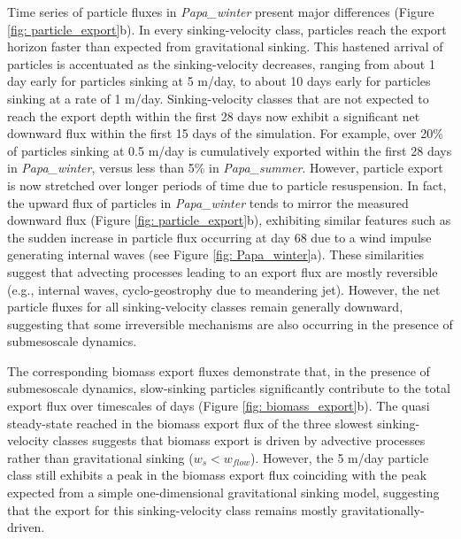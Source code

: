 \documentclass[draft,linenumbers]{agujournal2018}
\newcommand{\fixme}[1]{\color{red}$<$\textbf{FIX ME: #1}$>$\color{black}}
\begin{document}
Time series of particle fluxes in \textit{Papa\_winter} present major differences (Figure \ref{fig: particle_export}b). In every sinking-velocity class, particles reach the export horizon faster than expected from gravitational sinking. This hastened arrival of particles is accentuated as the sinking-velocity decreases, ranging from about 1 day early for particles sinking at 5 m/day, to about 10 days early for particles sinking at a rate of 1 m/day. Sinking-velocity classes that are not expected to reach the export depth within the first 28 days now exhibit a significant net downward flux within the first 15 days of the simulation. For example, over 20\% of particles sinking at 0.5 m/day is cumulatively exported within the first 28 days in \textit{Papa\_winter}, versus less than 5\% in \textit{Papa\_summer}. However, particle export is now stretched over longer periods of time due to particle resuspension. In fact, the upward flux of particles in \textit{Papa\_winter} tends to mirror the measured downward flux (Figure \ref{fig: particle_export}b), exhibiting similar features such as the sudden increase in particle flux occurring at day 68 due to a wind impulse generating internal waves (see Figure \ref{fig: Papa_winter}a). These similarities suggest that advecting processes leading to an export flux are mostly reversible (e.g., internal waves, cyclo-geostrophy due to meandering jet). However, the net particle fluxes for all sinking-velocity classes remain generally downward, suggesting that some irreversible mechanisms are also occurring in the presence of submesoscale dynamics. %

The corresponding biomass export fluxes demonstrate that, in the presence of submesoscale dynamics, slow-sinking particles significantly contribute to the total export flux over timescales of days (Figure \ref{fig: biomass_export}b). The quasi steady-state reached in the biomass export flux of the three slowest sinking-velocity classes suggests that biomass export is driven by advective processes rather than gravitational sinking ($w_s<w_{flow}$). However, the 5 m/day particle class still exhibits a peak in the biomass export flux coinciding with the peak expected from a simple one-dimensional gravitational sinking model, suggesting that the export for this sinking-velocity class remains mostly gravitationally-driven.
\end{document}
